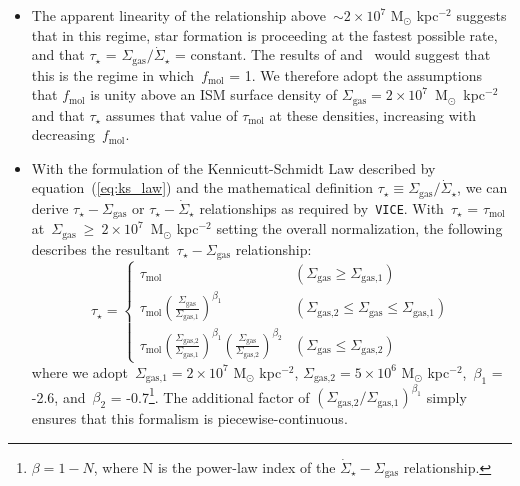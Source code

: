 \documentclass[fleqn, usenatbib]{mnras}
\newcommand{\refp}[1]{(\ref{#1})}
\begin{document}
\begin{itemize}
	\item The apparent linearity of the relationship above~$\sim2\times10^7$ 
	M$_\odot$ kpc$^{-2}$ suggests that in this regime, star formation is 
	proceeding at the fastest possible rate, and that $\tau_\star$ = 
	$\Sigma_\text{gas}/\dot{\Sigma}_\star$ = constant. The results of 
	\citet{Leroy2008, Leroy2013} and~\citet{Kennicutt2020} would suggest that 
	this is the regime in which~$f_\text{mol}$ = 1. We therefore adopt the 
	assumptions that $f_\text{mol}$ is unity above an ISM surface density of 
	$\Sigma_\text{gas} = 2\times10^7$~M$_\odot$~kpc$^{-2}$ and that 
	$\tau_\star$ assumes that value of $\tau_\text{mol}$ at these densities, 
	increasing with decreasing~$f_\text{mol}$. 

	\item With the formulation of the Kennicutt-Schmidt Law described by 
	equation~\refp{eq:ks_law} and the mathematical definition 
	$\tau_\star \equiv \Sigma_\text{gas}/\dot{\Sigma}_\star$, we can derive 
	$\tau_\star-\Sigma_\text{gas}$ or $\tau_\star-\dot{\Sigma}_\star$ 
	relationships as required by~\texttt{VICE}. With~$\tau_\star$ = 
	$\tau_\text{mol}$ at~$\Sigma_\text{gas}~\geq~2\times10^7$~M$_\odot$ 
	kpc$^{-2}$ setting the overall normalization, the following describes the 
	resultant~$\tau_\star-\Sigma_\text{gas}$ relationship: 
	\begin{equation}
	\tau_\star = \begin{cases} 
	\tau_\text{mol} & (\Sigma_\text{gas} \geq \Sigma_\text{gas,1}) 
	\\ 
	\tau_\text{mol} \left(\frac{\Sigma_\text{gas}}{\Sigma_\text{gas,1}}
		\right)^{\beta_1} & (\Sigma_\text{gas,2} \leq \Sigma_\text{gas} \leq 
		\Sigma_\text{gas,1}) 
	\\ 
	\tau_\text{mol} \left(\frac{\Sigma_\text{gas,2}}{\Sigma_\text{gas,1}}
		\right)^{\beta_1} \left(\frac{\Sigma_\text{gas}}{\Sigma_\text{gas,2}}
		\right)^{\beta_2} & (\Sigma_\text{gas} \leq \Sigma_\text{gas,2}) 
	\end{cases} 
	\end{equation} 
	where we adopt~$\Sigma_\text{gas,1} = 2\times10^7$ M$_\odot$ kpc$^{-2}$, 
	$\Sigma_\text{gas,2} = 5\times10^6$ M$_\odot$ kpc$^{-2}$,~$\beta_1$ = 
	-2.6, and~$\beta_2$ = -0.7\footnote{
		$\beta = 1 - N$, where N is the power-law index of the 
		$\dot{\Sigma}_\star-\Sigma_\text{gas}$ relationship. 
	}. The additional factor of 
	$(\Sigma_\text{gas,2}/\Sigma_\text{gas,1})^{\beta_1}$ simply ensures that 
	this formalism is piecewise-continuous. 


\end{itemize}
\end{document}
